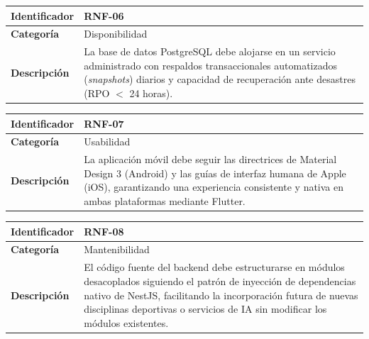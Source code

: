 \documentclass[12pt]{article}
\begin{document}
\begin{table}[h!]
    \centering
    \renewcommand{\arraystretch}{1.3}
    \begin{tabular}{|p{3.5cm}|p{11.5cm}|}
        \hline
        \rowcolor[HTML]{EFEFEF}
        \textbf{Identificador} & \textbf{RNF-06} \\ \hline
        \textbf{Categoría} & Disponibilidad \\ \hline
        \textbf{Descripción} & La base de datos PostgreSQL debe alojarse en un servicio administrado con respaldos transaccionales automatizados (\textit{snapshots}) diarios y capacidad de recuperación ante desastres (RPO $<$ 24 horas). \\ \hline
    \end{tabular}
\end{table}

\begin{table}[h!]
    \centering
    \renewcommand{\arraystretch}{1.3}
    \begin{tabular}{|p{3.5cm}|p{11.5cm}|}
        \hline
        \rowcolor[HTML]{EFEFEF}
        \textbf{Identificador} & \textbf{RNF-07} \\ \hline
        \textbf{Categoría} & Usabilidad \\ \hline
        \textbf{Descripción} & La aplicación móvil debe seguir las directrices de Material Design 3 (Android) y las guías de interfaz humana de Apple (iOS), garantizando una experiencia consistente y nativa en ambas plataformas mediante Flutter. \\ \hline
    \end{tabular}
\end{table}

\begin{table}[h!]
    \centering
    \renewcommand{\arraystretch}{1.3}
    \begin{tabular}{|p{3.5cm}|p{11.5cm}|}
        \hline
        \rowcolor[HTML]{EFEFEF}
        \textbf{Identificador} & \textbf{RNF-08} \\ \hline
        \textbf{Categoría} & Mantenibilidad \\ \hline
        \textbf{Descripción} & El código fuente del backend debe estructurarse en módulos desacoplados siguiendo el patrón de inyección de dependencias nativo de NestJS, facilitando la incorporación futura de nuevas disciplinas deportivas o servicios de IA sin modificar los módulos existentes. \\ \hline
    \end{tabular}
\end{table}
\newpage
\end{document}

